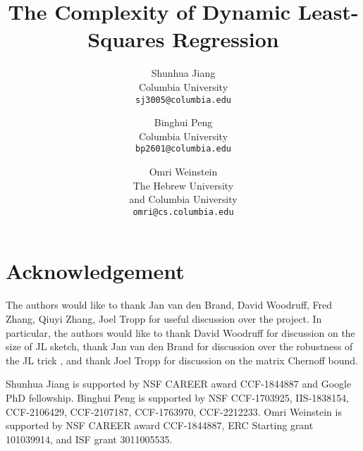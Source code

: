 \documentclass[11pt]{article}
\title{The Complexity of Dynamic Least-Squares Regression}
\date{}
\author{Shunhua Jiang \\ 
\vspace{.2in}
Columbia University\\ \texttt{sj3005@columbia.edu}
\and Binghui Peng \\ 
\vspace{.2in}
Columbia University\\
\texttt{bp2601@columbia.edu} 
\and Omri Weinstein\\ The Hebrew University \\  and Columbia University\\ \texttt{omri@cs.columbia.edu}
}
\begin{document}
\maketitle
\begin{abstract}
    
\end{abstract}
\setcounter{page}{0}
\thispagestyle{empty}
\newpage












\section*{Acknowledgement}
The authors would like to thank Jan van den Brand, David Woodruff, Fred Zhang, Qiuyi Zhang, Joel Tropp for useful discussion over the project. In particular, the authors would like to thank David Woodruff for discussion on the size of JL sketch, thank Jan van den Brand for discussion over the robustness of the JL trick , and thank Joel Tropp for discussion on the matrix Chernoff bound.

Shunhua Jiang is supported by NSF CAREER award CCF-1844887 and Google PhD fellowship. Binghui Peng is supported by NSF CCF-1703925, IIS-1838154, CCF-2106429, CCF-2107187, CCF-1763970, CCF-2212233. Omri Weinstein is supported by NSF CAREER award CCF-1844887, ERC Starting grant  101039914, and ISF grant 3011005535.




\newpage
\appendix





\end{document}
